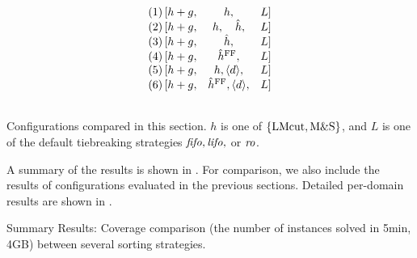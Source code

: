 \begin{table}[htbp]
 \centering
 \[
 \begin{array}{lcll}
  (1)\, [h+g, & h,                           &L] \\\relax
  (2)\, [h+g, & h,     \quad   \hat{h},      &L] \\\relax
  (3)\, [h+g, & \hat{h},                     &L] \\\relax
  (4)\, [h+g, & \hat{h}^{\text{FF}},               &L] \\\relax
  (5)\, [h+g, & h, {\left<d\right>}, &L] \\\relax
  (6)\, [h+g, & \hat{h}^{\text{FF}}, {\left<d\right>}, &L] \\\relax
 \end{array}  
 \]
 \caption{Configurations compared in this section. $h$ is
 one of ${\left\{\text{LMcut}, \text{M\&S}\right\}}$, and $L$ is one of the default
 tiebreaking strategies ${\text{\textit{fifo}}},{\text{\textit{lifo}}},$ or ${\text{\textit{ro}}}$. }
 \label{list:distance-configs}
\end{table}


A summary of the results is shown in . For
comparison, we also include the results of configurations evaluated in the previous sections.
Detailed per-domain results are shown in
.

\begin{table}[htbp]
 \centering
 
 \caption{
 Summary Results: Coverage comparison (the number
 of instances solved in 5min, 4GB) between several sorting strategies.
 }
 \label{tbl:dtg-summary}
\end{table}

